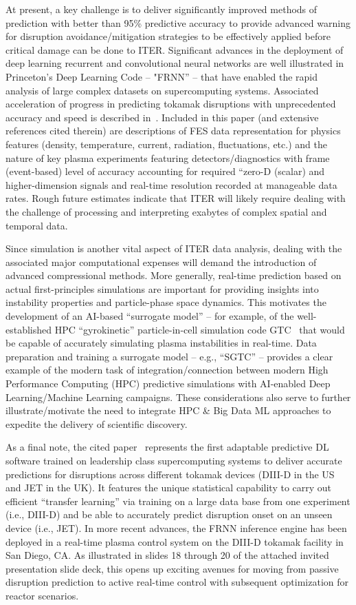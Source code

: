 At present, a key challenge is to deliver significantly improved methods of prediction with better than 95\% predictive accuracy to provide advanced warning for disruption avoidance/mitigation strategies to be effectively applied before critical damage can be done to ITER.  Significant advances in the deployment of deep learning recurrent and convolutional neural networks are well illustrated in Princeton’s Deep Learning Code -- "FRNN” – that have enabled the rapid analysis of large complex datasets on supercomputing systems.  Associated acceleration of progress in predicting tokamak disruptions with unprecedented accuracy and speed is described in~\cite{plasmaref}. Included in this paper (and extensive references cited therein) are descriptions of FES data representation for physics features (density, temperature, current, radiation, fluctuations, etc.) and the nature of key plasma experiments featuring detectors/diagnostics with frame (event-based) level of accuracy accounting for required “zero-D (scalar) and higher-dimension signals and real-time resolution recorded at manageable data rates. Rough future estimates indicate that ITER will likely require dealing with the challenge of processing and interpreting exabytes of complex spatial and temporal data. 

Since simulation is another vital aspect of ITER data analysis, dealing with the associated major computational expenses will demand the introduction of advanced compressional methods.  More generally, real-time prediction based on actual first-principles simulations are important for providing insights into instability properties and particle-phase space dynamics. This motivates the development of an AI-based “surrogate model” -- for example, of the well-established HPC “gyrokinetic” particle-in-cell simulation code GTC~\cite{plasmaref2} that would be capable of accurately simulating plasma instabilities in real-time.  Data preparation and training a surrogate model – e.g., “SGTC” -- provides a clear example of the modern task of integration/connection between modern High Performance Computing (HPC) predictive simulations with AI-enabled Deep Learning/Machine Learning campaigns.  These considerations also serve to further illustrate/motivate the need to integrate HPC \& Big Data ML approaches to expedite the delivery of scientific discovery.

As a final note, the cited paper~\cite{plasmaref} represents the first adaptable predictive DL software trained on leadership class supercomputing systems to deliver accurate predictions for disruptions across different tokamak devices (DIII-D in the US and JET in the UK).  It features the unique statistical capability to carry out efficient “transfer learning” via training on a large data base from one experiment (i.e., DIII-D) and be able to accurately predict disruption onset on an unseen device (i.e., JET).  In more recent advances, the FRNN inference engine has been deployed in a real-time plasma control system on the DIII-D tokamak facility in San Diego, CA.  As illustrated in slides 18 through 20 of the attached invited presentation slide deck, this opens up exciting avenues for moving from passive disruption prediction to active real-time control with subsequent optimization for reactor scenarios.  

